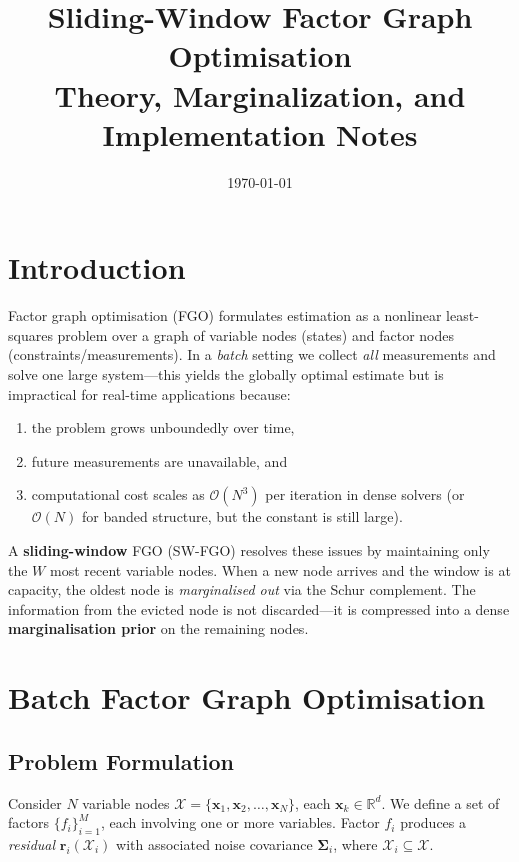 \documentclass[11pt,a4paper]{article}
\title{\textbf{Sliding-Window Factor Graph Optimisation}\\[4pt]
       \large Theory, Marginalization, and Implementation Notes}
\author{}
\date{\today}
\newcommand{\bx}{\bm{x}}
\newcommand{\br}{\bm{r}}
\newcommand{\bSigma}{\bm{\Sigma}}
\newcommand{\R}{\mathbb{R}}
\theoremstyle{definition}
\theoremstyle{plain}
\begin{document}
\maketitle

\tableofcontents
\vspace{1em}

\section{Introduction}
\label{sec:intro}

Factor graph optimisation (FGO) formulates estimation as a nonlinear
least-squares problem over a graph of variable nodes (states) and factor
nodes (constraints/measurements).  In a \emph{batch} setting we collect
\emph{all} measurements and solve one large system—this yields the
globally optimal estimate but is impractical for real-time applications
because:
\begin{enumerate}
  \item the problem grows unboundedly over time,
  \item future measurements are unavailable, and
  \item computational cost scales as $\mathcal{O}(N^3)$ per iteration in
        dense solvers (or $\mathcal{O}(N)$ for banded structure, but the
        constant is still large).
\end{enumerate}

A \textbf{sliding-window} FGO (SW-FGO) resolves these issues by
maintaining only the $W$ most recent variable nodes.  When a new node
arrives and the window is at capacity, the oldest node is \emph{marginalised
out} via the Schur complement.  The information from the evicted node is
not discarded—it is compressed into a dense \textbf{marginalisation
prior} on the remaining nodes.

\section{Batch Factor Graph Optimisation}
\label{sec:batch}

\subsection{Problem Formulation}

Consider $N$ variable nodes
$\mathcal{X} = \{\bx_1, \bx_2, \ldots, \bx_N\}$, each $\bx_k \in \R^d$.
We define a set of factors $\{f_i\}_{i=1}^{M}$, each involving one or more
variables.  Factor $f_i$ produces a \emph{residual} $\br_i(\mathcal{X}_i)$
with associated noise covariance $\bSigma_i$, where $\mathcal{X}_i \subseteq \mathcal{X}$.
\end{document}
